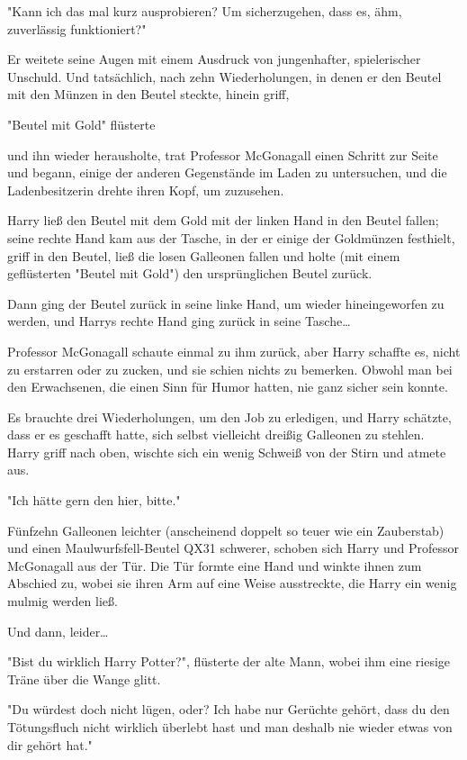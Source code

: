 {"Kann ich das mal kurz ausprobieren? Um sicherzugehen, dass es, ähm, zuverlässig funktioniert?"

Er weitete seine Augen mit einem Ausdruck von jungenhafter, spielerischer Unschuld. Und tatsächlich, nach zehn Wiederholungen, in denen er den Beutel mit den Münzen in den Beutel steckte, hinein griff,

"Beutel mit Gold" flüsterte

und ihn wieder herausholte, trat Professor McGonagall einen Schritt zur Seite und begann, einige der anderen Gegenstände im Laden zu untersuchen, und die Ladenbesitzerin drehte ihren Kopf, um zuzusehen.

Harry ließ den Beutel mit dem Gold mit der linken Hand in den Beutel fallen; seine rechte Hand kam aus der Tasche, in der er einige der Goldmünzen festhielt, griff in den Beutel, ließ die losen Galleonen fallen und holte (mit einem geflüsterten "Beutel mit Gold") den ursprünglichen Beutel zurück.

Dann ging der Beutel zurück in seine linke Hand, um wieder hineingeworfen zu werden, und Harrys rechte Hand ging zurück in seine Tasche…

Professor McGonagall schaute einmal zu ihm zurück, aber Harry schaffte es, nicht zu erstarren oder zu zucken, und sie schien nichts zu bemerken. Obwohl man bei den Erwachsenen, die einen Sinn für Humor hatten, nie ganz sicher sein konnte.

Es brauchte drei Wiederholungen, um den Job zu erledigen, und Harry schätzte, dass er es geschafft hatte, sich selbst vielleicht dreißig Galleonen zu stehlen. Harry griff nach oben, wischte sich ein wenig Schweiß von der Stirn und atmete aus.

"Ich hätte gern den hier, bitte."

Fünfzehn Galleonen leichter (anscheinend doppelt so teuer wie ein Zauberstab) und einen Maulwurfsfell-Beutel QX31 schwerer, schoben sich Harry und Professor McGonagall aus der Tür. Die Tür formte eine Hand und winkte ihnen zum Abschied zu, wobei sie ihren Arm auf eine Weise ausstreckte, die Harry ein wenig mulmig werden ließ.

Und dann, leider…

"Bist du wirklich Harry Potter?", flüsterte der alte Mann, wobei ihm eine riesige Träne über die Wange glitt.

"Du würdest doch nicht lügen, oder? Ich habe nur Gerüchte gehört, dass du den Tötungsfluch nicht wirklich überlebt hast und man deshalb nie wieder etwas von dir gehört hat."

}
